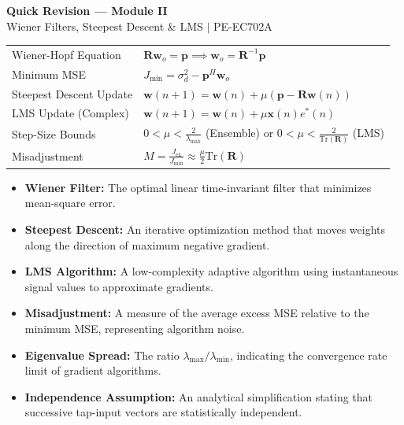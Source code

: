 \documentclass[12pt,a4paper]{article}
\renewcommand{\arraystretch}{1.45}
\begin{document}
\newpage
\begin{center}
  {\large\bfseries\color{myred} Quick Revision --- Module II}\\[3pt]
  {\small\color{mydark} Wiener Filters, Steepest Descent \& LMS $|$ PE-EC702A}
\end{center}
\noindent{\color{myred}\rule{\linewidth}{1.2pt}}
\vspace{4pt}

\begin{tcolorbox}[formulabox, title={\textbf{Key Formulas at a Glance}}]
\renewcommand{\arraystretch}{1.3}
\begin{tabularx}{\linewidth}{B{4.5cm} X}Wiener-Hopf Equation & $\mathbf{R} \mathbf{w}_o = \mathbf{p} \implies \mathbf{w}_o = \mathbf{R}^{-1} \mathbf{p}$ \\[6pt]
Minimum MSE & $J_{\text{min}} = \sigma_d^2 - \mathbf{p}^H \mathbf{w}_o$ \\[6pt]
Steepest Descent Update & $\mathbf{w}(n+1) = \mathbf{w}(n) + \mu (\mathbf{p} - \mathbf{R}\mathbf{w}(n))$ \\[6pt]
LMS Update (Complex) & $\mathbf{w}(n+1) = \mathbf{w}(n) + \mu \mathbf{x}(n) e^*(n)$ \\[6pt]
Step-Size Bounds & $0 < \mu < \frac{2}{\lambda_{\text{max}}}$ \quad (Ensemble) or $0 < \mu < \frac{2}{\text{Tr}(\mathbf{R})}$ \quad (LMS) \\[6pt]
Misadjustment & $M = \frac{J_{\text{ex}}}{J_{\text{min}}} \approx \frac{\mu}{2} \text{Tr}(\mathbf{R})$
\end{tabularx}
\end{tcolorbox}

\begin{tcolorbox}[defbox, title={\textbf{One-Line Definitions}}]
\begin{itemize}[leftmargin=*, itemsep=2.5pt, topsep=0pt]
  \item \textbf{Wiener Filter:} The optimal linear time-invariant filter that minimizes mean-square error.
  \item \textbf{Steepest Descent:} An iterative optimization method that moves weights along the direction of maximum negative gradient.
  \item \textbf{LMS Algorithm:} A low-complexity adaptive algorithm using instantaneous signal values to approximate gradients.
  \item \textbf{Misadjustment:} A measure of the average excess MSE relative to the minimum MSE, representing algorithm noise.
  \item \textbf{Eigenvalue Spread:} The ratio $\lambda_{\text{max}}/\lambda_{\text{min}}$, indicating the convergence rate limit of gradient algorithms.
  \item \textbf{Independence Assumption:} An analytical simplification stating that successive tap-input vectors are statistically independent.
\end{itemize}
\end{tcolorbox}
\end{document}
